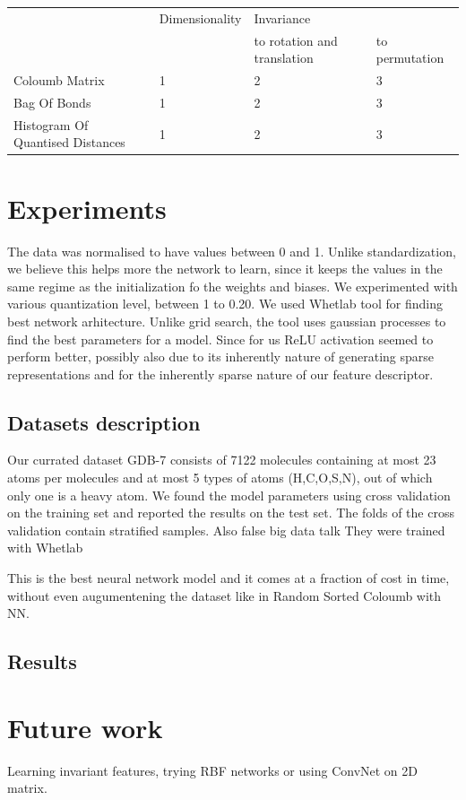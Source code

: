 \documentclass{article}
\begin{document}
\begin{tabular}{ l l l l }
& Dimensionality & Invariance  & \\ 
&  & to rotation and translation & to permutation \\ 
 Coloumb Matrix& 1& 2 & 3 \\
 Bag Of Bonds & 1& 2 & 3 \\
 Histogram Of Quantised Distances &1 & 2 & 3  \\
\end{tabular}

\section{Experiments}
The data was normalised to have values between 0 and 1. Unlike standardization,
we believe this helps more the network to learn, since it keeps the values in the same regime as the initialization fo the weights and biases.
We experimented with various quantization level, between 1 to 0.20.
We used Whetlab tool for finding best network arhitecture. Unlike grid search, the tool uses gaussian processes to find the best parameters for a model.
Since for us ReLU activation seemed to perform better, possibly also due to its inherently nature of generating sparse representations and for the inherently sparse nature of our feature descriptor.

\subsection{Datasets description}
Our currated dataset GDB-7 consists of 7122 molecules containing at most 23 atoms per molecules and at most 5 types of atoms (H,C,O,S,N), out of which only one is a heavy atom. We found the model parameters using cross validation on the training set and reported the results on the test set. The folds of the cross validation contain stratified samples.
Also false big data talk \cite{falsebigdata}
They were trained with Whetlab \cite{whetlab}

This is the best neural network model and it comes at a fraction of cost in time, without even augumentening the dataset like in Random Sorted Coloumb with NN.

\subsection{Results}

\section{Future work}
Learning invariant features, trying RBF networks or using ConvNet on 2D matrix.
\end{document}
